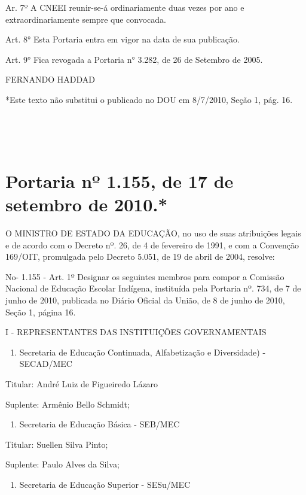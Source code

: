 \documentclass[
]{book}
\providecommand{\tightlist}{%
  \setlength{\itemsep}{0pt}\setlength{\parskip}{0pt}}
\begin{document}
Ar. 7º A CNEEI reunir-se-á ordinariamente duas vezes por ano e extraordinariamente sempre que convocada.

Art. 8° Esta Portaria entra em vigor na data de sua publicação.

Art. 9° Fica revogada a Portaria n° 3.282, de 26 de Setembro de 2005.

FERNANDO HADDAD

*Este texto não substitui o publicado no DOU em 8/7/2010, Seção 1, pág. 16.

~

~

\hypertarget{portaria-nuxba-1.155-de-17-de-setembro-de-2010.}{%
\section{Portaria nº 1.155, de 17 de setembro de 2010.*}\label{portaria-nuxba-1.155-de-17-de-setembro-de-2010.}}

O MINISTRO DE ESTADO DA EDUCAÇÃO, no uso de suas atribuições legais e de acordo com o Decreto nº. 26, de 4 de fevereiro de 1991, e com a Convenção 169/OIT, promulgada pelo Decreto 5.051, de 19 de abril de 2004, resolve:

No- 1.155 - Art. 1º Designar os seguintes membros para compor a Comissão Nacional de Educação Escolar Indígena, instituída pela Portaria nº. 734, de 7 de junho de 2010, publicada no Diário Oficial da União, de 8 de junho de 2010, Seção 1, página 16.

I - REPRESENTANTES DAS INSTITUIÇÕES GOVERNAMENTAIS

\begin{enumerate}
\def\labelenumi{\alph{enumi})}
\tightlist
\item
  Secretaria de Educação Continuada, Alfabetização e Diversidade) - SECAD/MEC
\end{enumerate}

Titular: André Luiz de Figueiredo Lázaro

Suplente: Armênio Bello Schmidt;

\begin{enumerate}
\def\labelenumi{\alph{enumi})}
\setcounter{enumi}{1}
\tightlist
\item
  Secretaria de Educação Básica - SEB/MEC
\end{enumerate}

Titular: Suellen Silva Pinto;

Suplente: Paulo Alves da Silva;

\begin{enumerate}
\def\labelenumi{\alph{enumi})}
\setcounter{enumi}{2}
\tightlist
\item
  Secretaria de Educação Superior - SESu/MEC
\end{enumerate}
\end{document}
